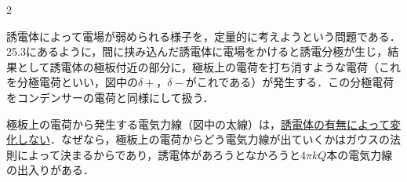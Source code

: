 \begin{multicols}{2}
\par\nopagebreak
\begin{sisin}
誘電体によって電場が弱められる様子を，定量的に考えようという問題である．25.3にあるように，間に挟み込んだ誘電体に電場をかけると誘電分極が生じ，結果として誘電体の極板付近の部分に，極板上の電荷を打ち消すような電荷（これを{\gtfamily 分極電荷}といい，図中の$\delta+$，$\delta-$がこれである）が発生する．この分極電荷をコンデンサーの電荷と同様にして扱う．

極板上の電荷から発生する電気力線（図中の太線）は，\underline{誘電体の}\hskip0pt\underline{有無によ}\hskip0pt\underline{って変化}\hskip0pt\underline{しない}．なぜなら，極板上の電荷からどう電気力線が出ていくかはガウスの法則によって決まるからであり，誘電体があろうとなかろうと$4\pi kQ$本の電気力線の出入りがある．


\end{sisin}
\end{multicols}
